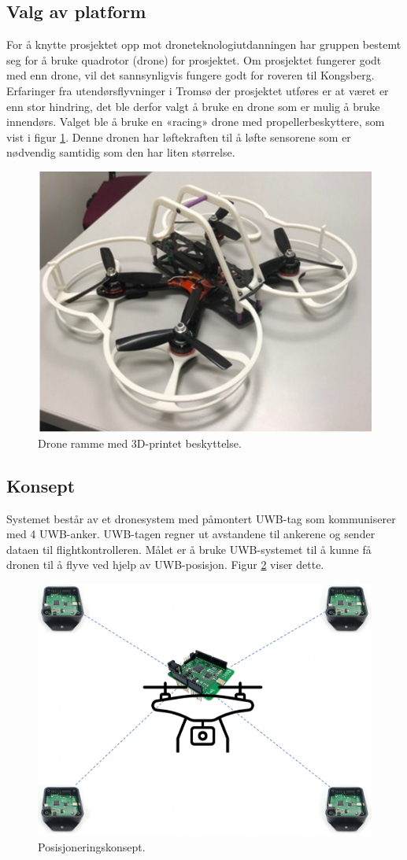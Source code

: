 \subsection{Valg av platform}

For å knytte prosjektet opp mot droneteknologiutdanningen har gruppen bestemt seg for å bruke quadrotor (drone) for prosjektet. Om prosjektet fungerer godt med enn drone, vil det sannsynligvis fungere godt for roveren til Kongsberg.
Erfaringer fra utendørsflyvninger i Tromsø der prosjektet utføres er at været er enn stor hindring, det ble derfor valgt å bruke en drone som er mulig å bruke innendørs. Valget ble å bruke en «racing» drone med propellerbeskyttere, som vist i figur \ref{fig:nakeddrone}. Denne dronen har løftekraften til å løfte sensorene som er nødvendig samtidig som den har liten størrelse. 

\begin{figure}[htp]
\centering
\includegraphics[width=0.6\columnwidth]{figures/nakeddrone}
\caption{Drone ramme med 3D-printet beskyttelse.}
\label{fig:nakeddrone}
\end{figure}

\subsection{Konsept}
Systemet består av et dronesystem med påmontert UWB-tag som kommuniserer med 4 UWB-anker. UWB-tagen regner ut avstandene til ankerene og sender dataen til flightkontrolleren. Målet er å bruke UWB-systemet til å kunne få dronen til å flyve ved hjelp av UWB-posisjon. Figur \ref{fig:konsept} viser dette.

\begin{figure}[htp]
\centering
\includegraphics[width=0.5\columnwidth]{figures/konsept}
\caption{Posisjoneringskonsept.}
\label{fig:konsept}
\end{figure}

